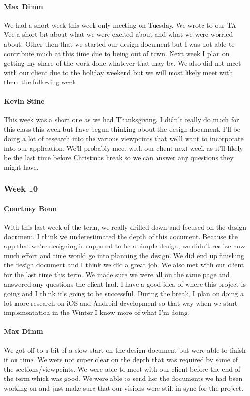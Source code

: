 			\paragraph{Max Dimm}
			We had a short week this week only meeting on Tuesday. We wrote to our TA Vee a short bit about what we were excited about and what we were worried about. Other then that we started our design document but I was not able to contribute much at this time due to being out of town. Next week I plan on getting my share of the work done whatever that may be. We also did not meet with our client due to the holiday weekend but we will most likely meet with them the following week.
			
			\paragraph{Kevin Stine}
			This week was a short one as we had Thanksgiving. I didn't really do much for this class this week but have begun thinking about the design document. I'll be doing a lot of research into the various viewpoints that we'll want to incorporate into our application. We'll probably meet with our client next week as it'll likely be the last time before Christmas break so we can answer any questions they might have.
			
		\subsubsection{Week 10}
		
			\paragraph{Courtney Bonn}
			With this last week of the term, we really drilled down and focused on the design document. I think we underestimated the depth of this document. Because the app that we're designing is supposed to be a simple design, we didn't realize how much effort and time would go into planning the design. We did end up finishing the design document and I think we did a great job. We also met with our client for the last time this term. We made sure we were all on the same page and answered any questions the client had. I have a good idea of where this project is going and I think it's going to be successful. During the break, I plan on doing a lot more research on iOS and Android development so that way when we start implementation in the Winter I know more of what I'm doing.

			\paragraph{Max Dimm}
			We got off to a bit of a slow start on the design document but were able to finish it on time. We were not super clear on the depth that was required by some of the sections/viewpoints. We were able to meet with our client before the end of the term which was good. We were able to send her the documents we had been working on and just make sure that our visions were still in sync for the project.
			
